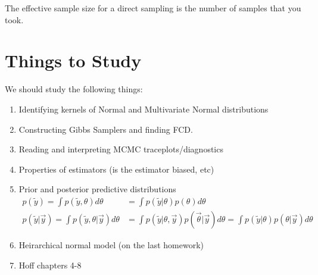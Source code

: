 \documentclass[titlepage, 12pt, leqno]{article}
\begin{document}
\begin{note}
    The effective sample size for a direct sampling is the number of samples 
    that you took.
\end{note}


\pagebreak
\section{Things to Study}
We should study the following things:
\begin{enumerate}
    \item Identifying kernels of Normal and Multivariate Normal distributions
    \item Constructing Gibbs Samplers and finding FCD.
    \item Reading and interpreting MCMC traceplots/diagnostics
    \item Properties of estimators (is the estimator biased, etc)
    \item Prior and posterior predictive distributions
        \begin{align*}
            p(\tilde{y}) = \int p(\tilde{y},\theta) d\theta &=\int p(\tilde{y}|
            \theta)p(\theta)d \theta\\
            p(\tilde{y}|\vec y) = \int p(\tilde{y}, \theta|\vec y)d \theta &=
            \int p(\tilde{y}|\theta,\vec y)p(\vec \theta|\vec y) d \theta =
            \int p(\tilde{y}|\theta)p(\theta|\vec y)d \theta
        \end{align*}
    \item Heirarchical normal model (on the last homework)
    \item Hoff chapters 4-8
\end{enumerate}
\end{document}
